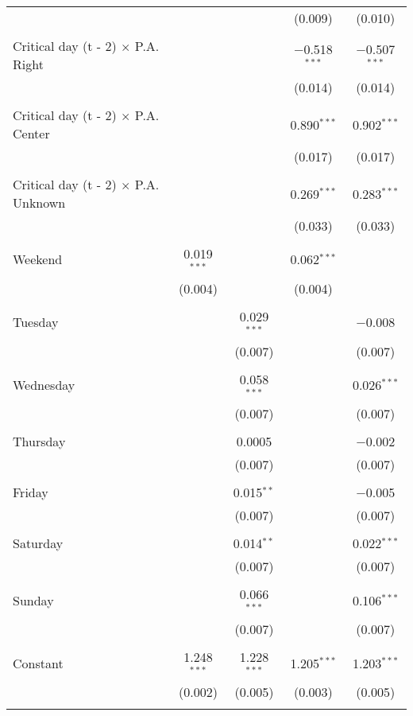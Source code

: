\documentclass[
]{article}
\begin{document}
\begin{table}[!htbp]
{\begin{tabular}{@{\extracolsep{5pt}}lcccc}
  &  &  & (0.009) & (0.010) \\ 
  & & & & \\ 
 Critical day (t - 2) $\times$ P.A. Right &  &  & $-$0.518$^{***}$ & $-$0.507$^{***}$ \\ 
  &  &  & (0.014) & (0.014) \\ 
  & & & & \\ 
 Critical day (t - 2) $\times$ P.A. Center &  &  & 0.890$^{***}$ & 0.902$^{***}$ \\ 
  &  &  & (0.017) & (0.017) \\ 
  & & & & \\ 
 Critical day (t - 2) $\times$ P.A. Unknown &  &  & 0.269$^{***}$ & 0.283$^{***}$ \\ 
  &  &  & (0.033) & (0.033) \\ 
  & & & & \\ 
 Weekend & 0.019$^{***}$ &  & 0.062$^{***}$ &  \\ 
  & (0.004) &  & (0.004) &  \\ 
  & & & & \\ 
 Tuesday &  & 0.029$^{***}$ &  & $-$0.008 \\ 
  &  & (0.007) &  & (0.007) \\ 
  & & & & \\ 
 Wednesday &  & 0.058$^{***}$ &  & 0.026$^{***}$ \\ 
  &  & (0.007) &  & (0.007) \\ 
  & & & & \\ 
 Thursday &  & 0.0005 &  & $-$0.002 \\ 
  &  & (0.007) &  & (0.007) \\ 
  & & & & \\ 
 Friday &  & 0.015$^{**}$ &  & $-$0.005 \\ 
  &  & (0.007) &  & (0.007) \\ 
  & & & & \\ 
 Saturday &  & 0.014$^{**}$ &  & 0.022$^{***}$ \\ 
  &  & (0.007) &  & (0.007) \\ 
  & & & & \\ 
 Sunday &  & 0.066$^{***}$ &  & 0.106$^{***}$ \\ 
  &  & (0.007) &  & (0.007) \\ 
  & & & & \\ 
 Constant & 1.248$^{***}$ & 1.228$^{***}$ & 1.205$^{***}$ & 1.203$^{***}$ \\ 
  & (0.002) & (0.005) & (0.003) & (0.005) \\ 
  & & & & \\ 

\end{tabular}}
\end{table}
\end{document}
